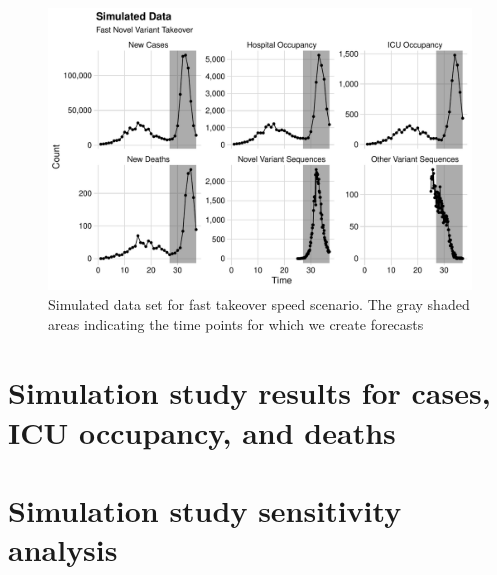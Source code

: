 \begin{figure}
    \centering
    \includegraphics[width=1.0\columnwidth]{simulated_binned_data_fast_plot}
    \caption[Simulated data set for fast takeover speed scenario.]{Simulated data set for fast takeover speed scenario.
    The gray shaded areas indicating the time points for which we create forecasts}
    \label{ch_5:fig:simulated_binned_data_fast_plot}
\end{figure}

\section{Simulation study results for cases, ICU occupancy, and deaths}
\label{ch_5:sec:sim_cases_icu_death}

\section{Simulation study sensitivity analysis}
\label{ch_5:sec:sim_sensitivity}